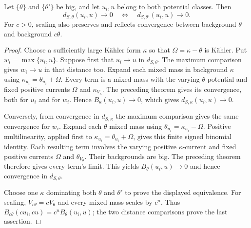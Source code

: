 
\begin{corollary}\label{cor:singularity-distance-background-independence}
Let $\{\theta\}$ and $\{\theta'\}$ be big, and let $u_i,u$ belong to both potential classes. Then
\[
 d_{S,\theta}(u_i,u)\to0
       \quad\Longleftrightarrow\quad d_{S,\theta'}(u_i,u)\to0.
\]
For $c>0$, scaling also preserves and reflects convergence between background $\theta$ and background $c\theta$.
\end{corollary}
\begin{proof}
Choose a sufficiently large K\"ahler form $\kappa$ so that $\Omega=\kappa-\theta$ is K\"ahler. Put $w_i=\max\{u_i,u\}$. Suppose first that $u_i\to u$ in $d_{S,\theta}$. The maximum comparison gives $w_i\to u$ in that distance too. Expand each mixed mass in background $\kappa$ using
$\kappa_{u_i}=\theta_{u_i}+\Omega$. Every term is a mixed mass with the varying $\theta$-potential and fixed positive currents $\Omega$ and $\kappa_{V_\kappa}$. The preceding theorem gives its convergence, both for $u_i$ and for $w_i$. Hence $B_\kappa(u_i,u)\to0$, which gives $d_{S,\kappa}(u_i,u)\to0$.

Conversely, from convergence in $d_{S,\kappa}$ the maximum comparison gives the same convergence for $w_i$. Expand each $\theta$ mixed mass using
$\theta_{u_i}=\kappa_{u_i}-\Omega$. Positive multilinearity, applied first to $\kappa_{u_i}=\theta_{u_i}+\Omega$, gives this finite signed binomial identity. Each resulting term involves the varying positive $\kappa$-current and fixed positive currents $\Omega$ and $\theta_{V_\theta}$. Their backgrounds are big. The preceding theorem therefore gives every term's limit. This yields $B_\theta(u_i,u)\to0$ and hence convergence in $d_{S,\theta}$.

Choose one $\kappa$ dominating both $\theta$ and $\theta'$ to prove the displayed equivalence. For scaling, $V_{c\theta}=cV_\theta$ and every mixed mass scales by $c^n$. Thus $B_{c\theta}(cu_i,cu)=c^nB_\theta(u_i,u)$; the two distance comparisons prove the last assertion.
\end{proof}

